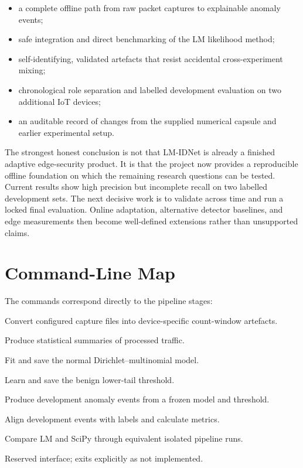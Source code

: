 \documentclass[11pt,a4paper]{article}
\newcommand{\projectname}{LM-IDNet}
\begin{document}
\begin{itemize}
  \item a complete offline path from raw packet captures to explainable anomaly events;
  \item safe integration and direct benchmarking of the LM likelihood method;
  \item self-identifying, validated artefacts that resist accidental cross-experiment mixing;
  \item chronological role separation and labelled development evaluation on two additional IoT devices;
  \item an auditable record of changes from the supplied numerical capsule and earlier experimental setup.
\end{itemize}

The strongest honest conclusion is not that \projectname{} is already a finished adaptive edge-security product. It is that the project now provides a reproducible offline foundation on which the remaining research questions can be tested. Current results show high precision but incomplete recall on two labelled development sets. The next decisive work is to validate across time and run a locked final evaluation. Online adaptation, alternative detector baselines, and edge measurements then become well-defined extensions rather than unsupported claims.

\appendix

\section{Command-Line Map}

The commands correspond directly to the pipeline stages:

\begin{description}[style=nextline,leftmargin=2.6cm,labelwidth=2.3cm]
  \item[\texttt{preprocess}] Convert configured capture files into device-specific count-window artefacts.
  \item[\texttt{diagnose}] Produce statistical summaries of processed traffic.
  \item[\texttt{train}] Fit and save the normal Dirichlet--multinomial model.
  \item[\texttt{calibrate}] Learn and save the benign lower-tail threshold.
  \item[\texttt{score}] Produce development anomaly events from a frozen model and threshold.
  \item[\texttt{evaluate}] Align development events with labels and calculate metrics.
  \item[\texttt{benchmark}] Compare LM and SciPy through equivalent isolated pipeline runs.
  \item[\texttt{adapt}] Reserved interface; exits explicitly as not implemented.
\end{description}
\end{document}
